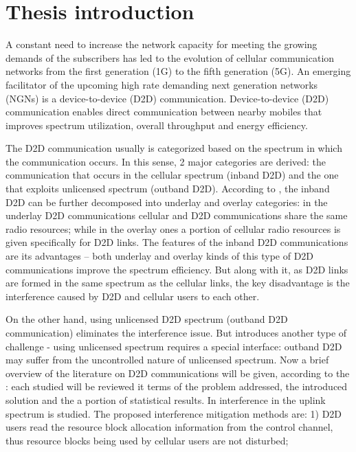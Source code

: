 \newpage
  \section {Thesis introduction}
    \par A constant need to increase the network capacity for meeting the growing demands of the subscribers has led to the evolution of cellular communication networks from the first generation (1G) to the fifth generation (5G). 
An emerging facilitator of the upcoming high rate demanding next generation networks (NGNs) is a device-to-device (D2D) communication. 
Device-to-device (D2D) communication enables direct communication between nearby mobiles that improves spectrum utilization, overall throughput and energy efficiency.
    \par The D2D communication usually is categorized based on the spectrum in which the communication occurs. In this sense, 2 major categories are derived: 
the communication that occurs in the cellular spectrum (inband D2D) and the one that exploits unlicensed spectrum (outband D2D).
According to \cite {survey}, the inband D2D can be further decomposed into underlay and overlay categories: 
in the underlay D2D communications cellular and D2D communications share the same radio resources; 
while in the overlay ones a portion of cellular radio resources is given specifically for D2D links. 
The features of the inband D2D communications are its advantages -- both underlay and overlay kinds of this type of D2D communications improve the spectrum efficiency. 
But along with it, as D2D links are formed in the same spectrum as the cellular links, the key disadvantage is the interference caused by D2D and cellular users to each other.
    \par On the other hand, using unlicensed D2D spectrum (outband D2D communication) eliminates the interference issue.
But introduces another type of challenge - using unlicensed spectrum requires a special interface: 
outband D2D may suffer from the uncontrolled nature of unlicensed spectrum. 
Now a brief overview of the literature on D2D communications will be given, according to the \cite {survey}: 
each studied will be reviewed it terms of the problem addressed, the introduced solution and the a portion of statistical results. 
In \cite {avoidance} interference in the uplink spectrum is studied. 
The proposed interference mitigation methods are: 
1) D2D users read the resource block allocation information from the control channel, thus resource blocks being used by cellular users are not disturbed; 
